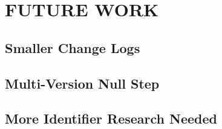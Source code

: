 
\chapter{FUTURE WORK}\label{ch:future}

\section{Smaller Change Logs}

\section{Multi-Version Null Step}

\section{More Identifier Research Needed}